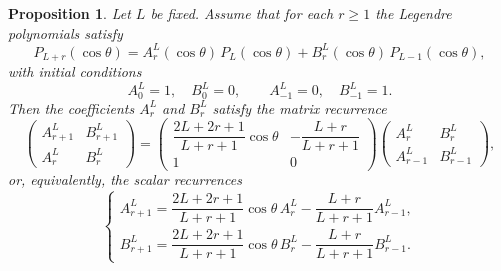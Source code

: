 \documentclass[10pt,a4paper]{amsart}
\newtheorem{prop}{Proposition}
\begin{document}
\begin{prop}
Let $L$ be fixed. Assume that for each $r \geq 1$ the Legendre polynomials satisfy
\[
P_{L+r}(\cos\theta)
= A_r^L(\cos\theta)\, P_L(\cos\theta)
+ B_r^L(\cos\theta)\, P_{L-1}(\cos\theta),
\]
with initial conditions
\[
A_0^L = 1, \quad B_0^L = 0, \qquad
A_{-1}^L = 0, \quad B_{-1}^L = 1.
\]
Then the coefficients $A_r^L$ and $B_r^L$ satisfy the matrix recurrence
\[
\begin{pmatrix}
A_{r+1}^L & B_{r+1}^L \\
A_r^L & B_r^L
\end{pmatrix}
=
\begin{pmatrix}
\dfrac{2L+2r+1}{L+r+1}\cos\theta &
-\dfrac{L+r}{L+r+1} \\
1 & 0
\end{pmatrix}
\begin{pmatrix}
A_r^L & B_r^L \\
A_{r-1}^L & B_{r-1}^L
\end{pmatrix},
\]
or, equivalently, the scalar recurrences
\[
\begin{cases}
A_{r+1}^L
= \dfrac{2L+2r+1}{L+r+1}\cos\theta\, A_r^L
- \dfrac{L+r}{L+r+1} A_{r-1}^L, \\[0.8em]
B_{r+1}^L
= \dfrac{2L+2r+1}{L+r+1}\cos\theta\, B_r^L
- \dfrac{L+r}{L+r+1} B_{r-1}^L.
\end{cases}
\]
\end{prop}
\end{document}

